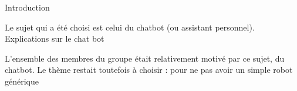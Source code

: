 	Introduction

  Le sujet qui a été choisi est celui du chatbot (ou assistant personnel). 
Explications sur le chat bot


L'ensemble des membres du groupe était relativement motivé par ce sujet, du chatbot. Le thème restait toutefois à choisir : pour ne pas avoir un simple robot générique


